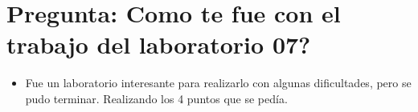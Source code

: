 \section{Pregunta: Como te fue con el trabajo del laboratorio 07?}
\begin{itemize}
	\item Fue un laboratorio interesante para realizarlo con algunas dificultades, pero se pudo terminar. Realizando los 4 puntos que se pedía.
\end{itemize}
